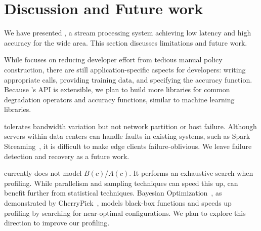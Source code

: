 \section{Discussion and Future work}
\label{sec:discussion}

We have presented \sysname{}, a stream processing system achieving low latency
and high accuracy for the wide area. This section discusses limitations and
future work.

 While \sysname{} focuses on reducing developer
effort from tedious manual policy construction, there are still
application-specific aspects for developers: writing appropriate \maybe{} calls,
providing training data, and specifying the accuracy function. Because
\sysname{}'s API is extensible, we plan to build more libraries for common
degradation operators and accuracy functions, similar to machine learning
libraries.

 \sysname{} tolerates bandwidth
variation but not network partition or host failure. Although servers within
data centers can handle faults in existing systems, such as Spark
Streaming~\cite{zaharia2013discretized}, it is difficult to make edge clients
failure-oblivious.  We leave failure detection and recovery as a future work.

 \sysname{} currently does not model $B(c)$/$A(c)$. It
performs an exhaustive search when profiling. While parallelism and sampling
techniques can speed this up, \sysname{} can benefit further from statistical
techniques. Bayesian Optimization~\cite{snoek2012practical}, as demonstrated by
CherryPick~\cite{alipourfard2017cherrypick}, models black-box functions and
speeds up profiling by searching for near-optimal configurations. We plan to
explore this direction to improve our profiling.



